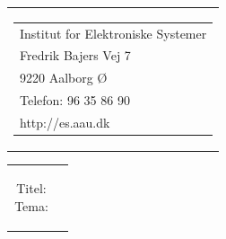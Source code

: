 \thispagestyle{empty}
\begin{titlingpage}
 \begin{nopagebreak}
 {\samepage
 \begin{tabular}{r}
\parbox{\textwidth}{  
 \hfill \parbox{4.7cm}{\begin{tabular}{l}
{\textsf\small  \textsf{Institut for Elektroniske Systemer}} \\
{\textsf\small Fredrik Bajers Vej 7} \\
{\textsf\small 9220 Aalborg Ø} \\
{\textsf\small Telefon:  96 35 86 90} \\
{\textsf\small http://es.aau.dk}
 \end{tabular}}
}
\\
\end{tabular}
 \begin{tabular}{cc}
\parbox{8cm}{
\begin{description}
 \item[Titel:]
 \item[Tema:]
\end{description}

}
\end{tabular}}
\end{nopagebreak}
\end{titlingpage}
